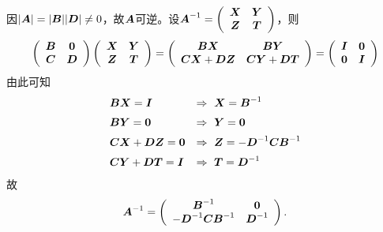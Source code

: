 \begin{frame}
  \begin{jie}
    因$|\boldsymbol{A}|=|\boldsymbol{B}||\boldsymbol{D}|\ne 0$，故$\boldsymbol{A}$可逆。\pause 设$\boldsymbol{A}^{-1}=\left(
      \begin{array}{cc}
        \boldsymbol{X}&\boldsymbol{Y}\\
        \boldsymbol{Z}&\boldsymbol{T}
      \end{array}
    \right)$，则
    $$
    \left(
      \begin{array}{cc}
        \MB&\M0\\
        \MC&\MD
      \end{array}
    \right) \left(
      \begin{array}{cc}
        \MX&\MY\\
        \MZ&\MT
      \end{array}
    \right)=\left(
      \begin{array}{cc}
        \MB\MX&\MB\MY\\
        \MC\MX+\MD\MZ&\MC\MY+\MD\MT
      \end{array}
    \right) = \left(
      \begin{array}{cc}
        \MI & \M0\\
        \M0 & \MI
      \end{array}
    \right)
    $$
    \pause
    由此可知
    $$
    \begin{array}{ll}
      \MB\MX = \MI   & \Rightarrow ~ \MX = \MB^{-1}\\[0.2cm]
      \MB\MY = \M0 & \Rightarrow ~ \MY = \M0\\[0.2cm]
      \MC\MX+\MD\MZ = \M0 & \Rightarrow ~ \MZ = -\MD^{-1}\MC\MB^{-1}\\[0.2cm]
      \MC\MY+\MD\MT = \MI & \Rightarrow ~ \MT = \MD^{-1}
    \end{array}
    $$
    \pause
    故
    $$
    \MA^{-1} = \left(
      \begin{array}{cc}
        \MB^{-1} & \M0\\
        -\MD^{-1}\MC\MB^{-1} & \MD^{-1}
      \end{array}
    \right).
    $$
  \end{jie}
\end{frame}


